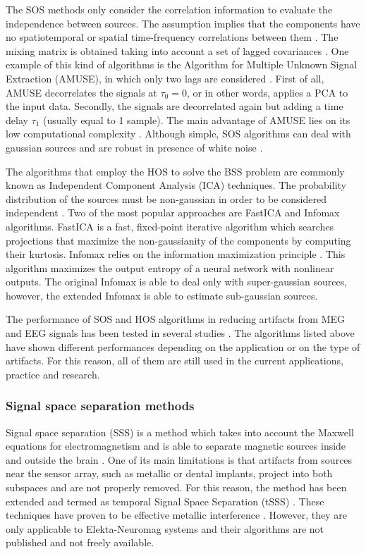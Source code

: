 The SOS methods only consider the correlation information to evaluate the independence between sources. The assumption implies that the components have no spatiotemporal or spatial time-frequency correlations between them \citep{James2005}. The mixing matrix is obtained taking into account a set of lagged covariances \citep{Hyvarinen2001}. One example of this kind of algorithms is the Algorithm for Multiple Unknown Signal Extraction (AMUSE), in which only two lags are considered \citep{Tong1991}. First of all, AMUSE decorrelates the signals at $\tau_0=0$, or in other words, applies a PCA to the input data. Secondly, the signals are decorrelated again but adding a time delay $\tau_1$ (usually equal to 1 sample). The main advantage of AMUSE lies on its low computational complexity \citep{Cichocki2005}. Although simple, SOS algorithms can deal with gaussian sources and are robust in presence of white noise \citep{James2005}.

The algorithms that employ the HOS to solve the BSS problem are commonly known as Independent Component Analysis (ICA) techniques. The probability distribution of the sources must be non-gaussian in order to be considered independent \citep{Hyvarinen2001}. Two of the most popular approaches are FastICA and Infomax algorithms. FastICA \citep{Hyvarinen2000} is a fast, fixed-point iterative algorithm which searches projections that maximize the non-gaussianity of the components by computing their kurtosis. Infomax relies on the information maximization principle \citep{Bell1995}. This algorithm maximizes the output entropy of a neural network with nonlinear outputs. The original Infomax is able to deal only with super-gaussian sources, however, the extended Infomax \citep{Lee1999} is able to estimate sub-gaussian sources. 

The performance of SOS and HOS algorithms in reducing artifacts from MEG and EEG signals has been tested in several studies \citep{Fatima2013,Breuer2014,Mantini2008,Escudero2011,Romero2008,Romero2009}. The algorithms listed above have shown different performances depending on the application or on the type of artifacts. For this reason, all of them are still used in the current applications, practice and research. 

\subsubsection{Signal space separation methods}

Signal space separation (SSS) is a method which takes into account the Maxwell equations for electromagnetism and is able to separate magnetic sources inside and outside the brain \citep{Taulu2004}. One of its main limitations is that artifacts from sources near the sensor array, such as metallic or dental implants, project into both subspaces and are not properly removed. For this reason, the method has been extended and termed as temporal Signal Space Separation (tSSS) \citep{Taulu2006}. These techniques have proven to be effective metallic interference \citep{Hillebrand2013}. However, they are only applicable to Elekta-Neuromag systems and their algorithms are not published and not freely available. 
        
